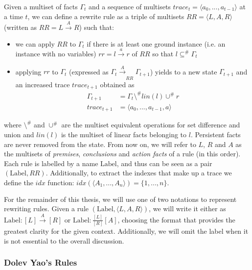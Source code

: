\begin{definition}
Given a multiset of facts $\Gamma_t$ and a sequence of multisets $trace_t = \langle a_0, ..., a_{t-1} \rangle$ at a time $t$, we can define a rewrite rule as a triple of multisets $RR = \langle L, A, R \rangle$ (written as $RR= L \xrightarrow{ A } R$) such that:

\begin{itemize}
    \item we can apply $RR$ to $\Gamma_t$ if there is at least one ground instance (i.e. an instance with no variables) $rr = l \xrightarrow{ a } r$ of $RR$ so that $l \subseteq^{\#} \Gamma_t$
    \item applying $rr$ to $\Gamma_t$ (expressed as $\Gamma_t \xrightarrow[]{A}_{RR} \Gamma_{t+1}$) yields to a new state $\Gamma_{t+1}$ and an increased trace $trace_{t+1}$ obtained as
\begin{align*}
    \Gamma_{t+1} &= \Gamma_t \setminus^{\#} lin(l) \cup^{\#} r\\
    trace_{t+1} &= \langle a_0, ..., a_{t-1}, a \rangle
\end{align*}
\end{itemize}
where $\setminus^{\#}$ and $\cup^{\#}$ are the multiset equivalent operations for set difference and union and $lin(l)$ is the multiset of linear facts belonging to $l$. Persistent facts are never removed from the state. From now on, we will refer to $L$, $R$ and $A$ as the multisets of \textit{premises}, \textit{conclusions} and \textit{action facts} of a rule (in this order). Each rule is labelled by a name $\text{Label}$, and thus can be seen as a pair $(\text{Label}, RR)$. Additionally, to extract the indexes that make up a trace we define the $idx$ function: $idx(\langle A_1, ..., A_n \rangle) = \{1, ..., n\}$.
\end{definition}

For the remainder of this thesis, we will use one of two notations to represent rewriting rules. Given a rule $(\text{Label}, \langle L, A, R \rangle)$, we will write it either as $\text{Label} : [ L ] \xrightarrow{A} [ R ]$ or $\text{Label} : \frac{\left[L\right]}{\left[R\right]}[A]$, choosing the format that provides the greatest clarity for the given context. Additionally, we will omit the label when it is not essential to the overall discussion.

\subsubsection{Dolev Yao's Rules}

